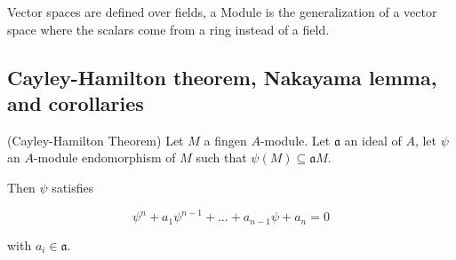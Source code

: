 \documentclass{article}
\theoremstyle{definition}
\newenvironment{prop}[1]
{\renewcommand\theinnerprop{#1}\innerprop}
{\endinnerprop}
\newenvironment{remark}[1]
{\renewcommand\theinnerremark{#1}\innerremark}
{\endinnerremark}
\newcommand{\aA}{\mathfrak{a}} %
\begin{document}
\begin{remark}{}
  Vector spaces are defined over fields, a Module is the generalization of a vector space where the scalars come from a ring instead of a field.
\end{remark}

\subsection{Cayley-Hamilton theorem, Nakayama lemma, and corollaries}

\begin{prop}{AM.2.4}(Cayley-Hamilton Theorem) \label{2.4}
  Let $M$ a fingen $A$-module. Let $\aA$ an ideal of $A$, let $\psi$ an
  $A$-module endomorphism of $M$ such that $\psi(M) \subseteq \aA M$.

  Then $\psi$ satisfies
  
  $$\psi^n + a_1 \psi^{n-1} + \ldots + a_{n-1} \psi + a_n = 0$$

  with $a_i \in \aA$.
\end{prop}
\end{document}
